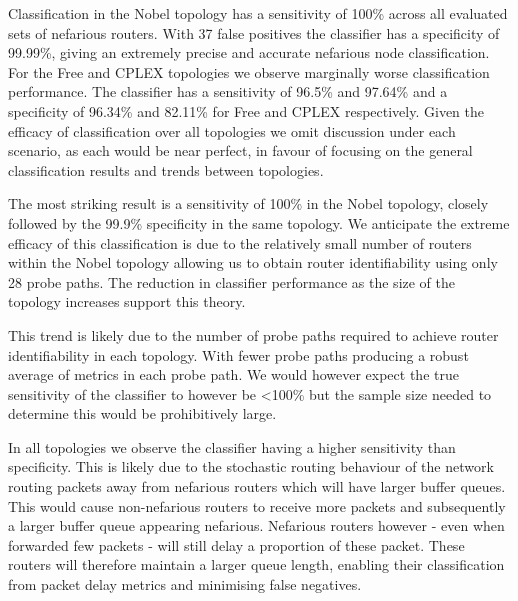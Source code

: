 Classification in the Nobel topology has a sensitivity of 100\% across all evaluated sets of nefarious routers. With 37 false positives the classifier has a specificity of 99.99\%, giving an extremely precise and accurate nefarious node classification. For the Free and CPLEX topologies we observe marginally worse classification performance. The classifier has a sensitivity of 96.5\% and 97.64\% and a specificity of 96.34\% and 82.11\% for Free and CPLEX respectively. Given the efficacy of classification over all topologies we omit discussion under each scenario, as each would be near perfect, in favour of focusing on the general classification results and trends between topologies.\par
The most striking result is a sensitivity of 100\% in the Nobel topology, closely followed by the 99.9\% specificity in the same topology. We anticipate the extreme efficacy of this classification is due to the relatively small number of routers within the Nobel topology allowing us to obtain router identifiability using only 28 probe paths. The reduction in classifier performance as the size of the topology increases support this theory.\par
This trend is likely due to the number of probe paths required to achieve router identifiability in each topology. With fewer probe paths producing a robust average of metrics in each probe path. We would however expect the true sensitivity of the classifier to however be <100\% but the sample size needed to determine this would be prohibitively large.\par
In all topologies we observe the classifier having a higher sensitivity than specificity. This is likely due to the stochastic routing behaviour of the network routing packets away from nefarious routers which will have larger buffer queues. This would cause non-nefarious routers to receive more packets and subsequently a larger buffer queue appearing nefarious. Nefarious routers however - even when forwarded few packets - will still delay a proportion of these packet. These routers will therefore maintain a larger queue length, enabling their classification from packet delay metrics and minimising false negatives.\par

